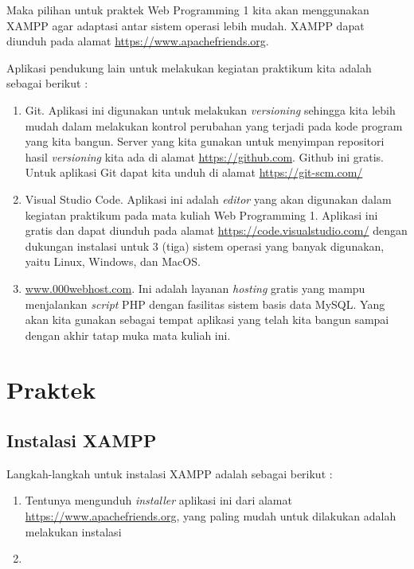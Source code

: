 Maka pilihan untuk praktek Web Programming 1 kita akan menggunakan XAMPP agar adaptasi antar sistem operasi lebih mudah. XAMPP dapat diunduh pada alamat \url{https://www.apachefriends.org}.

Aplikasi pendukung lain untuk melakukan kegiatan praktikum kita adalah sebagai berikut :

\begin{enumerate}
	\item Git. Aplikasi ini digunakan untuk melakukan \textit{versioning} sehingga kita lebih mudah dalam melakukan kontrol perubahan yang terjadi pada kode program yang kita bangun. Server yang kita gunakan untuk menyimpan repositori hasil \textit{versioning} kita ada di alamat \url{https://github.com}. Github ini gratis. Untuk aplikasi Git dapat kita unduh di alamat \url{https://git-scm.com/}
	\item Visual Studio Code. Aplikasi ini adalah \textit{editor} yang akan digunakan dalam kegiatan praktikum pada mata kuliah Web Programming 1. Aplikasi ini gratis dan dapat diunduh pada alamat \url{https://code.visualstudio.com/} dengan dukungan instalasi untuk 3 (tiga) sistem operasi yang banyak digunakan, yaitu Linux, Windows, dan MacOS.
	\item \url{www.000webhost.com}. Ini adalah layanan \textit{hosting} gratis yang mampu menjalankan \textit{script} PHP dengan fasilitas sistem basis data MySQL. Yang akan kita gunakan sebagai tempat aplikasi yang telah kita bangun sampai dengan akhir tatap muka mata kuliah ini.
\end{enumerate}

\section{Praktek}

\subsection{Instalasi XAMPP}

Langkah-langkah untuk instalasi XAMPP adalah sebagai berikut :

\begin{enumerate}

	\item Tentunya mengunduh \textit{installer} aplikasi ini dari alamat \url{https://www.apachefriends.org}, yang paling mudah untuk dilakukan adalah melakukan instalasi 
	
	\item 
	
\end{enumerate}

